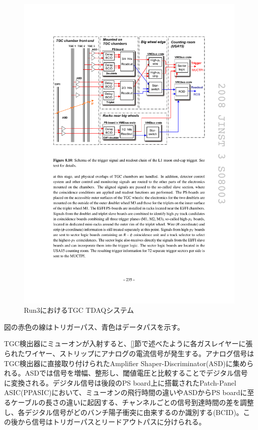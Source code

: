 \begin{figure} 
\centering
\includegraphics[width=16cm]{fig/Intro/TGC_run3tdaq.pdf}
\caption[Run3におけるTGC TDAQシステム]{Run3におけるTGC TDAQシステム}
\label{TGC_run3tdaq}
\end{figure}

図の赤色の線はトリガーパス、青色はデータパスを示す。

TGC検出器にミューオンが入射すると、\ref{}節で述べたように各ガスレイヤーに張られたワイヤー、ストリップにアナログの電流信号が発生する。アナログ信号はTGC検出器に直接取り付けられたAmplifier Shaper-Discriminator(ASD)に集められる。ASDでは信号を増幅、整形し、閾値電圧と比較することでデジタル信号に変換される。デジタル信号は後段のPS board上に搭載されたPatch-Panel ASIC(PPASIC)において、ミューオンの飛行時間の違いやASDからPS boardに至るケーブルの長さの違いに起因する、チャンネルごとの信号到達時間の差を調整し、各デジタル信号がどのバンチ陽子衝突に由来するのか識別する(BCID)。この後から信号はトリガーパスとリードアウトパスに分けられる。

